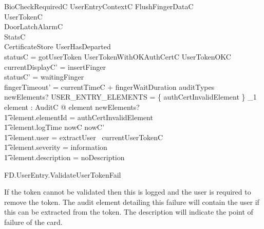 \begin{schema}{BioCheckRequiredC}
        UserEntryContextC
\also
        FlushFingerDataC
\\      \Xi UserTokenC
\\      \Xi DoorLatchAlarmC        
\\      \Xi StatsC
\\      \Xi CertificateStore
\where
        \lnot UserHasDeparted
\\      statusC = gotUserToken
\also
        \lnot UserTokenWithOKAuthCertC \land UserTokenOKC
\also
	currentDisplayC' = insertFinger
\\	statusC' = waitingFinger
\\      fingerTimeout' = currentTimeC + fingerWaitDuration
\also
        auditTypes~ newElements? \cap USER\_ENTRY\_ELEMENTS = 
        \{ authCertInvalidElement \} 
\also
        \exists_1 element : AuditC @ element \in newElements? 
\\ \t1  \land element.elementId = authCertInvalidElement
\\ \t1  \land element.logTime \in nowC \upto nowC'
\\ \t1  \land element.user = extractUser~ currentUserTokenC
\\ \t1  \land element.severity = information
\\ \t1  \land element.description = noDescription
\end{schema}

\begin{traceunit}{FD.UserEntry.ValidateUserTokenFail}
\end{traceunit}

If the token cannot be validated then this is logged and the user is
required to remove the token. The audit element detailing this failure
will contain the user if this can be extracted from the token. The
description will indicate the point of failure of the card.


